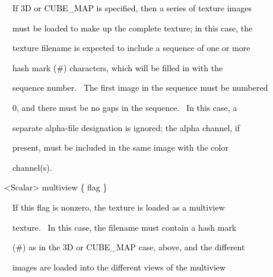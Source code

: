 \documentclass[a4paper]{article}
\newcommand\textstyleOOoComputerKeyWord[1]{\textrm{\textcolor[rgb]{0.0,0.0,0.5019608}{#1}}}
\begin{document}
\bigskip

{\color{black}
\textstyleOOoComputerKeyWord{\textcolor{black}{\ \ \ \ If 3D or CUBE\_MAP is specified, then a series of texture
images}}}

{\color{black}
\textstyleOOoComputerKeyWord{\textcolor{black}{\ \ \ \ must be loaded to make up the complete texture; in this case,
the}}}

{\color{black}
\textstyleOOoComputerKeyWord{\textcolor{black}{\ \ \ \ texture filename is expected to include a sequence of one or
more}}}

{\color{black}
\textstyleOOoComputerKeyWord{\textcolor{black}{\ \ \ \ hash mark ({\textquotedbl}\#{\textquotedbl}) characters, which
will be filled in with the}}}

{\color{black}
\textstyleOOoComputerKeyWord{\textcolor{black}{\ \ \ \ sequence number. \ The first image in the sequence must be
numbered}}}

{\color{black}
\textstyleOOoComputerKeyWord{\textcolor{black}{\ \ \ \ 0, and there must be no gaps in the sequence. \ In this case,
a}}}

{\color{black}
\textstyleOOoComputerKeyWord{\textcolor{black}{\ \ \ \ separate alpha-file designation is ignored; the alpha channel,
if}}}

{\color{black}
\textstyleOOoComputerKeyWord{\textcolor{black}{\ \ \ \ present, must be included in the same image with the color}}}

{\color{black}
\textstyleOOoComputerKeyWord{\textcolor{black}{\ \ \ \ channel(s).}}}


\bigskip

{\color{black}
\textstyleOOoComputerKeyWord{\textcolor{black}{\ \ {\textless}Scalar{\textgreater} multiview \{ flag \}}}}


\bigskip

{\color{black}
\textstyleOOoComputerKeyWord{\textcolor{black}{\ \ \ \ If this flag is nonzero, the texture is loaded as a multiview}}}

{\color{black}
\textstyleOOoComputerKeyWord{\textcolor{black}{\ \ \ \ texture. \ In this case, the filename must contain a hash mark}}}

{\color{black}
\textstyleOOoComputerKeyWord{\textcolor{black}{\ \ \ \ ({\textquotedbl}\#{\textquotedbl}) as in the 3D or CUBE\_MAP
case, above, and the different}}}

{\color{black}
\textstyleOOoComputerKeyWord{\textcolor{black}{\ \ \ \ images are loaded into the different views of the multiview}}}
\end{document}
